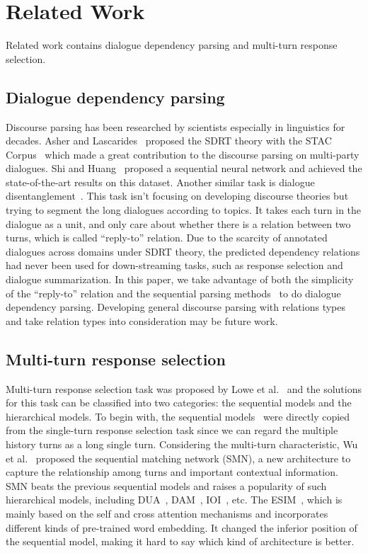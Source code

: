 \section{Related Work}
\label{sec:relatedwork}
Related work contains dialogue dependency parsing and multi-turn response selection.

\subsection{Dialogue dependency parsing}


Discourse parsing has been researched by scientists especially in linguistics for decades. 
Asher and Lascarides~ proposed the SDRT theory with the STAC Corpus~\cite{AsherHMBA16} which made a great contribution to the discourse parsing on multi-party dialogues. Shi and Huang~ proposed a sequential neural network and achieved the state-of-the-art results on this dataset. Another similar task is dialogue disentanglement~\cite{DuPX17}. This task isn't focusing on developing discourse theories but trying to segment the long dialogues according to topics. It takes each turn in the dialogue as a unit, and only care about whether there is a relation between two turns, which is called ``reply-to'' relation. Due to the scarcity of annotated dialogues across domains under SDRT theory, the predicted dependency relations had never been used for down-streaming tasks, such as response selection and dialogue summarization. In this paper, we take advantage of both the simplicity of the ``reply-to'' relation and the sequential parsing methods~\cite{ShiH19} to do dialogue dependency parsing. Developing general discourse parsing with relations types and take relation types into consideration may be future work.



\subsection{Multi-turn response selection}
\label{sec:mtrs}
Multi-turn response selection task was proposed by Lowe et al.~ and the solutions for this task can be classified into two categories: the sequential models and the hierarchical models. To begin with, the sequential models~\cite{LowePSP15} were directly copied from the single-turn response selection task since we can regard the multiple history turns as a long single turn.  Considering the multi-turn characteristic, Wu et al.~ proposed the sequential matching network (SMN), a new architecture to capture the relationship among turns and important contextual information. SMN beats the previous sequential models and raises a popularity of such hierarchical models, including DUA~\cite{ZhangLZZL18}, DAM~\cite{WuLCZDYZL18}, IOI~\cite{TaoWXHZY19}, etc. The ESIM~\cite{abs-1802-02614}, which is mainly based on the self and cross attention mechanisms and incorporates different kinds of pre-trained word embedding. It changed the inferior position of the sequential model, making it hard to say which kind of architecture is better.


